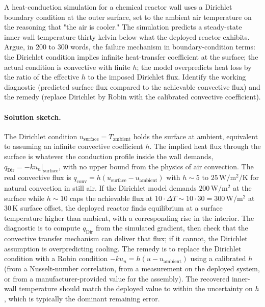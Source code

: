 \begin{exercise}
A heat-conduction simulation for a chemical reactor wall uses a
Dirichlet boundary condition at the outer surface, set to the
ambient air temperature on the reasoning that "the air is
cooler." The simulation predicts a steady-state inner-wall
temperature thirty kelvin below what the deployed reactor
exhibits. Argue, in 200 to 300 words, the failure mechanism in
boundary-condition terms: the Dirichlet condition implies
infinite heat-transfer coefficient at the surface; the actual
condition is convective with finite $h$; the model overpredicts
heat loss by the ratio of the effective $h$ to the imposed
Dirichlet flux. Identify the working diagnostic (predicted
surface flux compared to the achievable convective flux) and the
remedy (replace Dirichlet by Robin with the calibrated convective
coefficient).

\paragraph{Solution sketch.}
The Dirichlet condition $u_{\text{surface}} = T_{\text{ambient}}$
holds the surface at ambient, equivalent to assuming an infinite
convective coefficient $h$. The implied heat flux through the
surface is whatever the conduction profile inside the wall
demands, $q_{\text{Dir}} = -k u_{n}|_{\text{surface}}$, with no
upper bound from the physics of air convection. The real
convective flux is $q_{\text{conv}} = h(u_{\text{surface}} -
u_{\text{ambient}})$ with $h \sim 5$ to $25\,\si{\watt\per\meter
\squared\per\kelvin}$ for natural convection in still air. If
the Dirichlet model demands $200\,\si{\watt\per\meter\squared}$
at the surface while $h \sim 10$ caps the achievable flux at
$10 \cdot \Delta T \sim 10 \cdot 30 = 300\,\si{\watt\per\meter
\squared}$ at $30\,\si{\kelvin}$ surface offset, the deployed
reactor finds equilibrium at a surface temperature higher than
ambient, with a corresponding rise in the interior. The
diagnostic is to compute $q_{\text{Dir}}$ from the simulated
gradient, then check that the convective transfer mechanism
can deliver that flux; if it cannot, the Dirichlet assumption
is overpredicting cooling. The remedy is to replace the
Dirichlet condition with a Robin condition $-k u_{n} = h(u -
u_{\text{ambient}})$ using a calibrated $h$ (from a Nusselt-number
correlation, from a measurement on the deployed system, or from
a manufacturer-provided value for the assembly). The recovered
inner-wall temperature should match the deployed value to within
the uncertainty on $h$, which is typically the dominant remaining
error.
\end{exercise}

